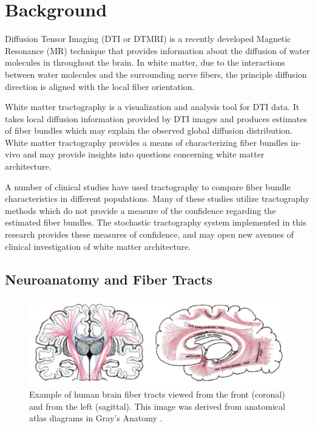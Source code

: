 \chapter{Background}

Diffusion Tensor Imaging (DTI or DTMRI) is a recently developed Magnetic Resonance (MR) technique that provides information about the diffusion of water molecules in throughout the brain.  In white matter, due to the interactions between water molecules and the surrounding nerve fibers, the principle diffusion direction is aligned with the local fiber orientation.

White matter tractography is a visualization and analysis tool for DTI data.  It takes local diffusion information provided by DTI images and produces estimates of fiber bundles which may explain the observed global diffusion distribution.  White matter tractography provides a means of characterizing fiber bundles in-vivo and may provide insights into questions concerning white matter architecture.

A number of clinical studies have used tractography to compare fiber bundle characteristics in different populations.  Many of these studies utilize tractography methods which do not provide a measure of the confidence regarding the estimated fiber bundles.  The stochastic tractography system implemented in this research provides these measures of confidence, and may open new avenues of clinical investigation of white matter architecture.

\section{Neuroanatomy and Fiber Tracts}
\begin{figure} \label{fig:graysfibertracts}
	\includegraphics[width=\linewidth]{graysfibertracts}
	\caption{Example of human brain fiber tracts viewed from the front (coronal) and from the left (sagittal).  This image was derived from anatomical atlas diagrams in Gray's Anatomy \cite{odonnel06}.}
\end{figure}

